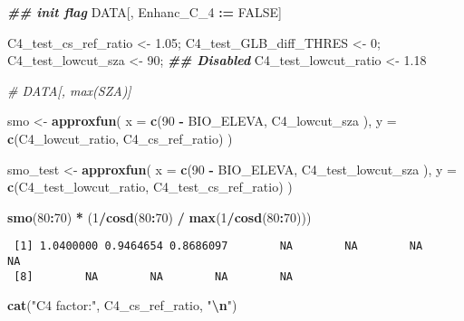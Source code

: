\documentclass[
  10pt,
  a4paper,oneside]{article}
\newenvironment{Shaded}{\begin{snugshade}}{\end{snugshade}}
\newcommand{\AttributeTok}[1]{\textcolor[rgb]{0.13,0.29,0.53}{#1}}
\newcommand{\CommentTok}[1]{\textcolor[rgb]{0.56,0.35,0.01}{\textit{#1}}}
\newcommand{\ConstantTok}[1]{\textcolor[rgb]{0.56,0.35,0.01}{#1}}
\newcommand{\DecValTok}[1]{\textcolor[rgb]{0.00,0.00,0.81}{#1}}
\newcommand{\DocumentationTok}[1]{\textcolor[rgb]{0.56,0.35,0.01}{\textbf{\textit{#1}}}}
\newcommand{\FloatTok}[1]{\textcolor[rgb]{0.00,0.00,0.81}{#1}}
\newcommand{\FunctionTok}[1]{\textcolor[rgb]{0.13,0.29,0.53}{\textbf{#1}}}
\newcommand{\NormalTok}[1]{#1}
\newcommand{\OtherTok}[1]{\textcolor[rgb]{0.56,0.35,0.01}{#1}}
\newcommand{\SpecialCharTok}[1]{\textcolor[rgb]{0.81,0.36,0.00}{\textbf{#1}}}
\newcommand{\StringTok}[1]{\textcolor[rgb]{0.31,0.60,0.02}{#1}}
\begin{document}
\begin{Shaded}
\begin{Highlighting}[]
\DocumentationTok{\#\# init flag}
\NormalTok{DATA[, Enhanc\_C\_4 }\SpecialCharTok{:=} \ConstantTok{FALSE}\NormalTok{]}

\NormalTok{C4\_test\_cs\_ref\_ratio   }\OtherTok{\textless{}{-}} \FloatTok{1.05}\NormalTok{;}
\NormalTok{C4\_test\_GLB\_diff\_THRES }\OtherTok{\textless{}{-}}  \DecValTok{0}\NormalTok{;}
\NormalTok{C4\_test\_lowcut\_sza     }\OtherTok{\textless{}{-}} \DecValTok{90}\NormalTok{;  }\DocumentationTok{\#\# Disabled}
\NormalTok{C4\_test\_lowcut\_ratio   }\OtherTok{\textless{}{-}} \FloatTok{1.18}

\CommentTok{\# DATA[, max(SZA)]}

\NormalTok{smo }\OtherTok{\textless{}{-}} \FunctionTok{approxfun}\NormalTok{(}
  \AttributeTok{x =} \FunctionTok{c}\NormalTok{(}\DecValTok{90} \SpecialCharTok{{-}}\NormalTok{ BIO\_ELEVA,  C4\_lowcut\_sza  ),}
  \AttributeTok{y =} \FunctionTok{c}\NormalTok{(C4\_lowcut\_ratio, C4\_cs\_ref\_ratio)}
\NormalTok{)}

\NormalTok{smo\_test }\OtherTok{\textless{}{-}} \FunctionTok{approxfun}\NormalTok{(}
  \AttributeTok{x =} \FunctionTok{c}\NormalTok{(}\DecValTok{90} \SpecialCharTok{{-}}\NormalTok{ BIO\_ELEVA,       C4\_test\_lowcut\_sza  ),}
  \AttributeTok{y =} \FunctionTok{c}\NormalTok{(C4\_test\_lowcut\_ratio, C4\_test\_cs\_ref\_ratio)}
\NormalTok{)}

\FunctionTok{smo}\NormalTok{(}\DecValTok{80}\SpecialCharTok{:}\DecValTok{70}\NormalTok{) }\SpecialCharTok{*}\NormalTok{ (}\DecValTok{1}\SpecialCharTok{/}\FunctionTok{cosd}\NormalTok{(}\DecValTok{80}\SpecialCharTok{:}\DecValTok{70}\NormalTok{) }\SpecialCharTok{/} \FunctionTok{max}\NormalTok{(}\DecValTok{1}\SpecialCharTok{/}\FunctionTok{cosd}\NormalTok{(}\DecValTok{80}\SpecialCharTok{:}\DecValTok{70}\NormalTok{)))}
\end{Highlighting}
\end{Shaded}

\begin{verbatim}
 [1] 1.0400000 0.9464654 0.8686097        NA        NA        NA        NA
 [8]        NA        NA        NA        NA
\end{verbatim}

\begin{Shaded}
\begin{Highlighting}[]
\FunctionTok{cat}\NormalTok{(}\StringTok{"C4 factor:"}\NormalTok{, C4\_cs\_ref\_ratio,   }\StringTok{"}\SpecialCharTok{\textbackslash{}n}\StringTok{"}\NormalTok{)}
\end{Highlighting}
\end{Shaded}
\end{document}

